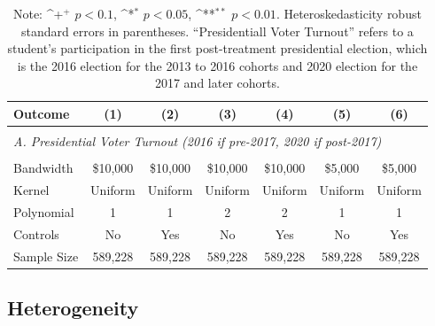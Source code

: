 \documentclass[12pt,letterpaper,oneside]{book}
\newcommand{\basepath}{g:/My Drive/Grad School}
\newcommand{\basepath}{basepath}
\begin{document}
\begin{table}[h!]\centering
    \def\sym#1{\ifmmode^{#1}\else\(^{#1}\)\fi}
    \caption{Cal Grant Time Heterogeneity in Treatment Effects Test\label{tab:calgrant_ttest}}
    \begin{tabular}{l*{6}{c}}
        \hline\hline
        Outcome&\multicolumn{1}{c}{(1)}&\multicolumn{1}{c}{(2)}&\multicolumn{1}{c}{(3)}&\multicolumn{1}{c}{(4)}&\multicolumn{1}{c}{(5)}&\multicolumn{1}{c}{(6)}\\
        \hline
        &&&&&&\\
        \multicolumn{7}{l}{\textit{A. Presidential Voter Turnout (2016 if  pre-2017, 2020 if  post-2017)}} \\ [0.5em]
         [0.5em]


        &&&&&&\\

        \hline
        Bandwidth & \$10,000       &   \$10,000        &   \$10,000        &   \$10,000       &   \$5,000        &   \$5,000        \\
        Kernel&   Uniform      &   Uniform        &   Uniform        &   Uniform       &   Uniform       &   Uniform       \\
        Polynomial&   1       &   1        &   2        &   2       &   1       &   1       \\
        Controls&   No       &   Yes        &   No        &   Yes        &   No        &   Yes        \\
        Sample Size      &  589,228      &    589,228      &     589,228       &   589,228     &   589,228       &   589,228         \\
        \hline
    \end{tabular}
    \caption*{\footnotesize Note: \sym{+} \(p<0.1\), \sym{*} \(p<0.05\), \sym{**} \(p<0.01\). Heteroskedasticity robust standard errors in parentheses. ``Presidentiall Voter Turnout'' refers to a student's participation in the first post-treatment presidential election, which is the 2016 election for the 2013 to 2016 cohorts and 2020 election for the 2017 and later cohorts.}
\end{table}



\clearpage


\subsection{Heterogeneity}\label{sec:HTE}
\end{document}
